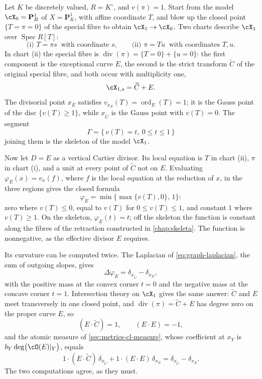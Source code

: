 \begin{example}
\label{ex:ch01-blowup-model-function}
Let $K$ be discretely valued, $R=K^\circ$, and $v(\pi)=1$.  Start from the
model $\cX_0=\mathbf P^1_R$ of $X=\mathbf P^1_K$, with affine coordinate
$T$, and blow up the closed point $\{T=\pi=0\}$ of the special fibre to
obtain $\cX_1\to\cX_0$.  Two charts describe $\cX_1$ over
$\operatorname{Spec}R[T]$:
\[
 \text{(i) } T=\pi s\ \text{ with coordinate }s ,
 \qquad
 \text{(ii) } \pi=Tu\ \text{ with coordinates }T,u .
\]
In chart (ii) the special fibre is $\operatorname{div}(\pi)
=\{T=0\}+\{u=0\}$: the first component is the exceptional curve $E$, the
second is the strict transform $\widetilde C$ of the original special
fibre, and both occur with multiplicity one,
\[
   \cX_{1,s}=\widetilde C+E .
\]
The divisorial point $x_E$ satisfies $v_{x_E}(T)=\operatorname{ord}_E(T)=1$;
it is the Gauss point of the disc $\{v(T)\geq1\}$, while $x_{\widetilde C}$
is the Gauss point with $v(T)=0$.  The segment
\[
  \Gamma=\{\,v(T)=t,\ 0\leq t\leq1\,\}
\]
joining them is the skeleton of the model $\cX_1$.

Now let $D=E$ as a vertical Cartier divisor.  Its local equation is $T$ in
chart (ii), $\pi$ in chart (i), and a unit at every point of
$\widetilde C$ not on $E$.  Evaluating $\varphi_E(x)=v_x(f)$, where $f$ is
the local equation at the reduction of $x$, in the three regions gives the
closed formula
\begin{equation}\label{eq:ch01-blowup-model-function}
   \varphi_E=\min\bigl\{\max\{v(T),0\},\,1\bigr\}:
\end{equation}
zero where $v(T)\leq0$, equal to $v(T)$ for $0\leq v(T)\leq1$, and constant
$1$ where $v(T)\geq1$.  On the skeleton, $\varphi_E(t)=t$; off the skeleton
the function is constant along the fibres of the retraction constructed in
\cref{chap:skeleta}.  The function is nonnegative, as the effective divisor
$E$ requires.

Its curvature can be computed twice.  The Laplacian of
\eqref{eq:graph-laplacian}, the sum of outgoing slopes, gives
\[
 \Delta\varphi_E=\delta_{x_{\widetilde C}}-\delta_{x_E},
\]
with the positive mass at the convex corner $t=0$ and the negative mass at
the concave corner $t=1$.  Intersection theory on $\cX_1$ gives the same
answer: $\widetilde C$ and $E$ meet transversely in one closed point, and
$\operatorname{div}(\pi)=\widetilde C+E$ has degree zero on the proper
curve $E$, so
\[
  (E\cdot\widetilde C)=1,
  \qquad
  (E\cdot E)=-1 ,
\]
and the atomic measure of \cref{sec:metrics-cl-measure}, whose coefficient
at $x_Y$ is $b_Y\deg\bigl(\cO(E)|_Y\bigr)$, equals
\[
 1\cdot(E\cdot\widetilde C)\,\delta_{x_{\widetilde C}}
 +1\cdot(E\cdot E)\,\delta_{x_E}
 =\delta_{x_{\widetilde C}}-\delta_{x_E}.
\]
The two computations agree, as they must.
\end{example}

